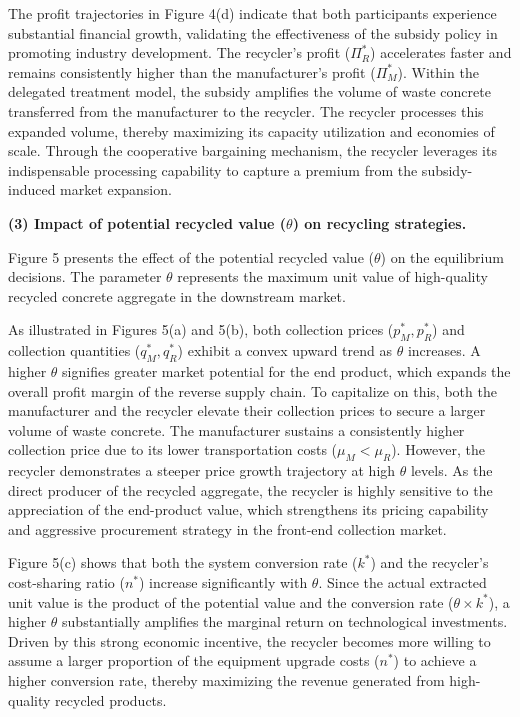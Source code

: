 \documentclass[authoryear,preprint,review,times,10pt]{elsarticle}
\begin{document}
The profit trajectories in Figure 4(d) indicate that both participants experience substantial financial growth, validating the effectiveness of the subsidy policy in promoting industry development. The recycler's profit ($\Pi_R^*$) accelerates faster and remains consistently higher than the manufacturer's profit ($\Pi_M^*$). Within the delegated treatment model, the subsidy amplifies the volume of waste concrete transferred from the manufacturer to the recycler. The recycler processes this expanded volume, thereby maximizing its capacity utilization and economies of scale. Through the cooperative bargaining mechanism, the recycler leverages its indispensable processing capability to capture a premium from the subsidy-induced market expansion.

\noindent\textbf{(3) Impact of potential recycled value ($\theta$) on recycling strategies.}

Figure 5 presents the effect of the potential recycled value ($\theta$) on the equilibrium decisions. The parameter $\theta$ represents the maximum unit value of high-quality recycled concrete aggregate in the downstream market.

As illustrated in Figures 5(a) and 5(b), both collection prices ($p_M^*, p_R^*$) and collection quantities ($q_M^*, q_R^*$) exhibit a convex upward trend as $\theta$ increases. A higher $\theta$ signifies greater market potential for the end product, which expands the overall profit margin of the reverse supply chain. To capitalize on this, both the manufacturer and the recycler elevate their collection prices to secure a larger volume of waste concrete. The manufacturer sustains a consistently higher collection price due to its lower transportation costs ($\mu_M < \mu_R$). However, the recycler demonstrates a steeper price growth trajectory at high $\theta$ levels. As the direct producer of the recycled aggregate, the recycler is highly sensitive to the appreciation of the end-product value, which strengthens its pricing capability and aggressive procurement strategy in the front-end collection market.

Figure 5(c) shows that both the system conversion rate ($k^*$) and the recycler's cost-sharing ratio ($n^*$) increase significantly with $\theta$. Since the actual extracted unit value is the product of the potential value and the conversion rate ($\theta \times k^*$), a higher $\theta$ substantially amplifies the marginal return on technological investments. Driven by this strong economic incentive, the recycler becomes more willing to assume a larger proportion of the equipment upgrade costs ($n^*$) to achieve a higher conversion rate, thereby maximizing the revenue generated from high-quality recycled products.
\end{document}
